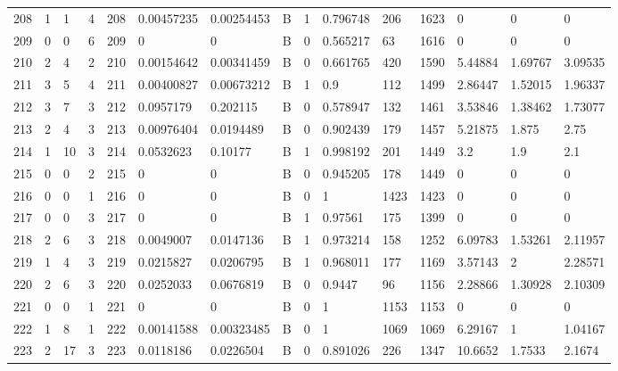 \begin{latin}
\begin{longtable}{lllllllllllllll}
	208 & 1  & 1   & 4  & 208 & 0.00457235     & 0.00254453     & B & 1  & 0.796748 & 206  & 1623 & 0       & 0       & 0       \\
	209 & 0  & 0   & 6  & 209 & 0              & 0              & B & 0  & 0.565217 & 63   & 1616 & 0       & 0       & 0       \\
	210 & 2  & 4   & 2  & 210 & 0.00154642     & 0.00341459     & B & 0  & 0.661765 & 420  & 1590 & 5.44884 & 1.69767 & 3.09535 \\
	211 & 3  & 5   & 4  & 211 & 0.00400827     & 0.00673212     & B & 1  & 0.9      & 112  & 1499 & 2.86447 & 1.52015 & 1.96337 \\
	212 & 3  & 7   & 3  & 212 & 0.0957179      & 0.202115       & B & 0  & 0.578947 & 132  & 1461 & 3.53846 & 1.38462 & 1.73077 \\
	213 & 2  & 4   & 3  & 213 & 0.00976404     & 0.0194489      & B & 0  & 0.902439 & 179  & 1457 & 5.21875 & 1.875   & 2.75    \\
	214 & 1  & 10  & 3  & 214 & 0.0532623      & 0.10177        & B & 1  & 0.998192 & 201  & 1449 & 3.2     & 1.9     & 2.1     \\
	215 & 0  & 0   & 2  & 215 & 0              & 0              & B & 0  & 0.945205 & 178  & 1449 & 0       & 0       & 0       \\
	216 & 0  & 0   & 1  & 216 & 0              & 0              & B & 0  & 1        & 1423 & 1423 & 0       & 0       & 0       \\
	217 & 0  & 0   & 3  & 217 & 0              & 0              & B & 1  & 0.97561  & 175  & 1399 & 0       & 0       & 0       \\
	218 & 2  & 6   & 3  & 218 & 0.0049007      & 0.0147136      & B & 1  & 0.973214 & 158  & 1252 & 6.09783 & 1.53261 & 2.11957 \\
	219 & 1  & 4   & 3  & 219 & 0.0215827      & 0.0206795      & B & 1  & 0.968011 & 177  & 1169 & 3.57143 & 2       & 2.28571 \\
	220 & 2  & 6   & 3  & 220 & 0.0252033      & 0.0676819      & B & 0  & 0.9447   & 96   & 1156 & 2.28866 & 1.30928 & 2.10309 \\
	221 & 0  & 0   & 1  & 221 & 0              & 0              & B & 0  & 1        & 1153 & 1153 & 0       & 0       & 0       \\
	222 & 1  & 8   & 1  & 222 & 0.00141588     & 0.00323485     & B & 0  & 1        & 1069 & 1069 & 6.29167 & 1       & 1.04167 \\
	223 & 2  & 17  & 3  & 223 & 0.0118186      & 0.0226504      & B & 0  & 0.891026 & 226  & 1347 & 10.6652 & 1.7533  & 2.1674  \\

\end{longtable}
\end{latin}

